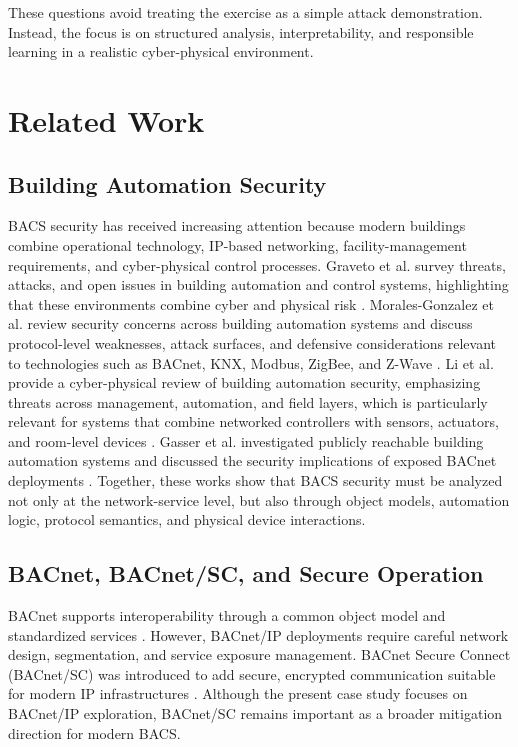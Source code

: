 \documentclass[10pt,conference]{IEEEtran}
\begin{document}
These questions avoid treating the exercise as a simple attack demonstration. Instead, the focus is on structured analysis, interpretability, and responsible learning in a realistic cyber-physical environment.

\section{Related Work}

\subsection{Building Automation Security}

BACS security has received increasing attention because modern buildings combine operational technology, IP-based networking, facility-management requirements, and cyber-physical control processes. Graveto et al. survey threats, attacks, and open issues in building automation and control systems, highlighting that these environments combine cyber and physical risk \cite{graveto2022bacs}. Morales-Gonzalez et al. review security concerns across building automation systems and discuss protocol-level weaknesses, attack surfaces, and defensive considerations relevant to technologies such as BACnet, KNX, Modbus, ZigBee, and Z-Wave \cite{morales2024bas}. Li et al. provide a cyber-physical review of building automation security, emphasizing threats across management, automation, and field layers, which is particularly relevant for systems that combine networked controllers with sensors, actuators, and room-level devices \cite{li2023critical}. Gasser et al. investigated publicly reachable building automation systems and discussed the security implications of exposed BACnet deployments \cite{gasser2017bacnet}. Together, these works show that BACS security must be analyzed not only at the network-service level, but also through object models, automation logic, protocol semantics, and physical device interactions.

\subsection{BACnet, BACnet/SC, and Secure Operation}

BACnet supports interoperability through a common object model and standardized services \cite{ashrae_bacnet}. However, BACnet/IP deployments require careful network design, segmentation, and service exposure management. BACnet Secure Connect (BACnet/SC) was introduced to add secure, encrypted communication suitable for modern IP infrastructures \cite{bacnet_sc_whitepaper}. Although the present case study focuses on BACnet/IP exploration, BACnet/SC remains important as a broader mitigation direction for modern BACS.
\end{document}
